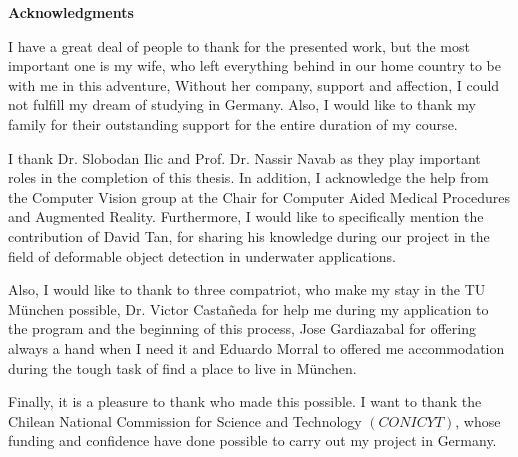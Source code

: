 \clearemptydoublepage
{}
{}	



\vspace*{2cm}

\begin{center}
{\Large \bf Acknowledgments}
\end{center}

\vspace{1cm}

I have a great deal of people to thank for the presented work, but the most important
one is my wife, who left everything behind in our home country to be with me in this
adventure, Without her company, support and affection, I could not fulfill
my dream of studying in Germany.
Also, I would like to thank my family for their outstanding support for the entire
duration of my course.

I thank Dr. Slobodan Ilic and Prof. Dr. Nassir Navab as they
play important roles in the completion of this thesis. In addition, I acknowledge the
help from the Computer Vision group at the Chair for Computer Aided Medical Procedures
and Augmented Reality. Furthermore, I would like to specifically mention the contribution
of David Tan, for sharing his knowledge during our project in the field of deformable
object detection in underwater applications.

Also, I would like to thank to three compatriot, who make my stay in the TU M{\"u}nchen possible, 
Dr. Victor Casta\~{n}eda for help me during my application to the program and
the beginning of this process, Jose Gardiazabal for offering always a hand 
when I need it and Eduardo Morral to offered me accommodation during the tough task of 
find a place to live in M{\"u}nchen.

Finally, it is a pleasure to  thank who made this possible. I want to thank the Chilean National
Commission for Science and Technology $(CONICYT)$, whose funding and confidence have
done possible to carry out my project in Germany.




